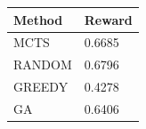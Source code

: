 \begin{tabular}{ll}
\hline
Method & Reward \\
\hline
  MCTS & 0.6685 \\
  RANDOM & 0.6796 \\
  GREEDY & 0.4278 \\
  GA & 0.6406 \\
\hline
\end{tabular}
